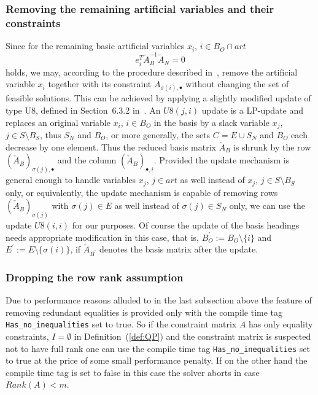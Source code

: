 \documentclass[a4paper]{article}
\begin{document}
\subsubsection{Removing the remaining artificial variables and their
constraints}
Since for the remaining basic artificial variables $x_{i}$,
$i \in B_{O} \cap art$
\begin{equation}
e_{i}^{T}\check{A}_{B}^{-1}\tilde{A}_{N} = 0 
\end{equation}
holds,
we may, according to the procedure described in~\cite{Chvatal}, remove
the artificial variable $x_{i}$ together with its constraint
$A_{\sigma(i), \bullet}$ without changing the set of feasible solutions.
This can be achieved by applying a slightly modified update
of type U8, defined in Section~6.3.2 in~\cite{Sven}. An $U8(j,i)$ update is a
LP-update and replaces an original variable $x_{i}$, $i \in B_{O}$ in the basis
by a slack variable $x_{j}$, $j \in S \setminus B_{S}$,
thus $S_{N}$ and $B_{O}$, or more generally, the sets
$C=E \cup S_{N}$ and $B_{O}$ each decrease by one element. Thus the reduced
basis matrix $\check{A}_{B}$ is shrunk by the
row $\left(\check{A}_{B}\right)_{\sigma(j), \bullet}$ and
the column $\left(\check{A}_{B}\right)_{\bullet, i}$. Provided the
update mechanism is general enough to handle variables $x_{j}$, $j \in art$ as
well instead of $x_{j}$, $j \in S \setminus B_{S}$ only, or equivalently,
the update mechanism is capable of
removing rows $\left(\check{A}_{B}\right)_{\sigma(j)}$ with $\sigma(j) \in E$
as well instead of $\sigma(j) \in S_{N}$ only, we can use the update $U8(i,i)$
for our purposes.
Of course the update of the basis headings needs appropriate modification
in this case, that is, $B_{O}^{\prime}:=B_{O} \setminus \{i\}$ and
$E^{\prime}:=E \setminus \{ \sigma(i)\}$, if $\check{A}_{B^{\prime}}$ denotes
the basis matrix after the update.

\subsubsection{Dropping the row rank assumption}
Due to performance reasons alluded to in the last subsection above the feature
of removing redundant equalities is provided only with the compile time tag
\texttt{Has\_no\_inequalities} set to true. So if the constraint matrix $A$ has
only equality constraints, $I=\emptyset$ in Definition~(\ref{def:QP}) and the
constraint matrix is suspected not to have full rank one can use the
compile time tag \texttt{Has\_no\_inequalities} set to true at the price of
some small performance penalty. If on the other hand the compile time tag is
set to false in this case the solver aborts in case $Rank(A)<m$.  
\end{document}
